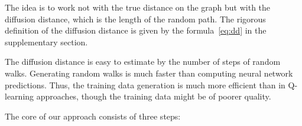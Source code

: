\documentclass[reqno,11pt]{amsart}
\begin{document}
The idea is to work not with the true distance on the graph but with the diffusion distance, which is the length of the random path. The rigorous definition of the diffusion distance is given by the formula~\eqref{eq:dd} in the supplementary section.




The diffusion distance is easy to estimate by the number of steps of random walks. Generating random walks is much faster than computing neural network predictions. Thus, the training data generation is much more efficient than in Q-learning approaches, though the training data might be of poorer quality. 



The core of our approach consists of three steps:
\end{document}
